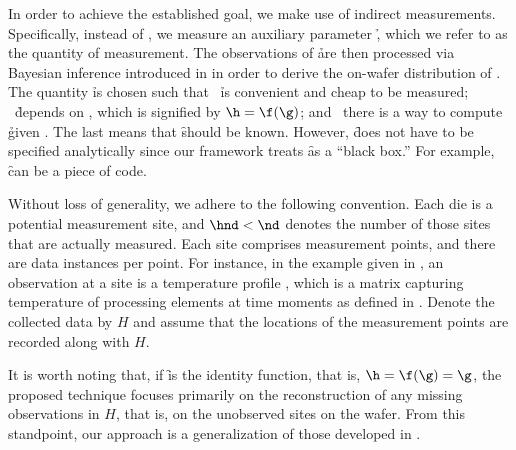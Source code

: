 In order to achieve the established goal, we make use of indirect measurements.
Specifically, instead of \g, we measure an auxiliary parameter \h, which we
refer to as the quantity of measurement. The observations of \h are then
processed via Bayesian inference introduced in  in
order to derive the on-wafer distribution of \g. The quantity \h is chosen such
that \one~\h is convenient and cheap to be measured; \two~\h depends on \g,
which is signified by $\h = \f(\g)$; and \three~there is a way to compute \h
given \g. The last means that \f should be known. However, \f does not have to
be specified analytically since our framework treats \f as a ``black box.'' For
example, \f can be a piece of code.

Without loss of generality, we adhere to the following convention. Each die is a
potential measurement site, and $\hnd < \nd$ denotes the number of those sites
that are actually measured. Each site comprises \np measurement points, and
there are \ns data instances per point. For instance, in the example given in
, an observation at a site is a temperature profile \mq,
which is a matrix capturing temperature of \np processing elements at \ns time
moments as defined in . Denote the collected data by
$H$ and assume that the locations of the measurement points are recorded along
with $H$.

It is worth noting that, if \f is the identity function, that is, $\h = \f(\g) =
\g$, the proposed technique focuses primarily on the reconstruction of any
missing observations in $H$, that is, on the unobserved sites on the wafer. From
this standpoint, our approach is a generalization of those developed in
\cite{reda2009, zhang2010}.

